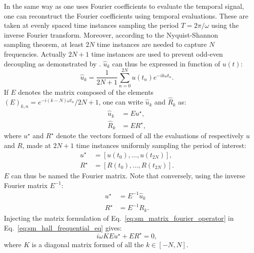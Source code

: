 In the same way as one uses Fourier coefficients to
evaluate the temporal signal,
one can reconstruct the Fourier coefficients using
temporal evaluations. These are taken at evenly spaced time instances
sampling the period $T = 2 \pi / \omega$ using the inverse
Fourier transform. Moreover, 
according to the Nyquist-Shannon~\cite{Shannon1949} sampling theorem, 
at least $2N$ time instances are needed to capture $N$ frequencies. Actually
$2N+1$ time instances are used to prevent odd-even decoupling as
demonstrated by \citet{Weide2005}. $\widehat{u}_k$ can thus
be expressed in function of $u(t)$:
\begin{equation}
	\widehat{u}_k = \frac{1}{2N+1} 
	\sum_{n=0}^{2N} u(t_n) e^{-i k \omega t_n}.
\end{equation}
If $E$ denotes the matrix composed of the elements 
$(E)_{k,n} = e^{-i (k - N) \omega t_n} / 2N+1$, one can write $\widehat{u}_k$
and $\widehat{R}_k$ as:
\begin{equation}
	\begin{split}
		\widehat{u}_k &= E u^\star, \\
		\widehat{R}_k &= E R^\star,
	\end{split}
	\label{eq:sm_matrix_fourier_operator}
\end{equation}
where $u^\star$ and $R^\star$ 
denote the vectors formed of all the evaluations of respectively $u$
and $R$,
made at $2N+1$ time instances uniformly sampling the period of interest:
\begin{equation}
	\begin{split}
		u^\star &= [u(t_0), \ldots, u(t_{2N})], \\
		R^\star &= [R(t_0), \ldots, R(t_{2N})].
	\end{split}
\end{equation}
$E$ can thus be named the Fourier matrix.
Note that conversely, using the inverse Fourier matrix $E^{-1}$:
\begin{equation}
	\begin{split}
		u^\star &= E^{-1} \widehat{u}_k \\
		R^\star &= E^{-1} \widehat{R}_k.
	\end{split}
	\label{eq:sm_sampling_hb_var}
\end{equation}
Injecting the matrix formulation of 
Eq.~\eqref{eq:sm_matrix_fourier_operator} in 
Eq.~\eqref{eq:sm_hall_frequential_eq}
gives:
\begin{equation}
	i \omega K E u^\star + E R^\star = 0,
\end{equation}
where $K$ is a diagonal matrix formed of all the $k \in [-N, N]$.
